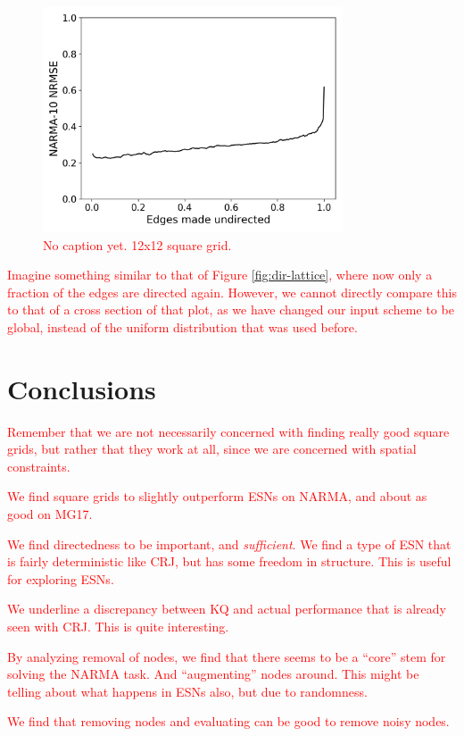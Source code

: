 \begin{figure}
  \centering
  \includegraphics[width=3.5in]{figures/undir-performance.png}
  \caption{
    \textcolor{red}{
      No caption yet. 12x12 square grid.
    }
  }
  \label{fig:undirection-performance}
\end{figure}

\textcolor{red}{
  Imagine something similar to that of Figure \ref{fig:dir-lattice}, where now
only a fraction of the edges are directed again. However, we cannot directly
compare this to that of a cross section of that plot, as we have changed our
input scheme to be global, instead of the uniform distribution that was used
before.
}

\section{Conclusions}

\textcolor{red}{
  Remember that we are not necessarily concerned with finding really good square
grids, but rather that they work at all, since we are concerned with spatial
constraints.
}

\textcolor{red}{
  We find square grids to slightly outperform ESNs on NARMA, and about as good
on MG17.
}

\textcolor{red}{
  We find directedness to be important, and \textit{sufficient}. We find a type
of ESN that is fairly deterministic like CRJ, but has some freedom in
structure. This is useful for exploring ESNs.
}

\textcolor{red}{
  We underline a discrepancy between KQ and actual performance that is already
seen with CRJ. This is quite interesting.
}

\textcolor{red}{
  By analyzing removal of nodes, we find that there seems to be a ``core'' stem
for solving the NARMA task. And ``augmenting'' nodes around. This might be
telling about what happens in ESNs also, but due to randomness.
}

\textcolor{red}{
  We find that removing nodes and evaluating can be good to remove noisy nodes.
}


